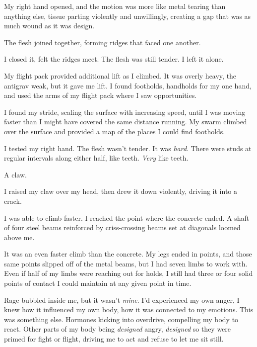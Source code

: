 My right hand opened, and the motion was more like metal tearing than anything else, tissue parting violently and unwillingly, creating a gap that was as much wound as it was design.



The flesh joined together, forming ridges that faced one another.



I closed it, felt the ridges meet.  The flesh was still tender.  I left it alone.



My flight pack provided additional lift as I climbed.  It was overly heavy, the antigrav weak, but it gave me lift.  I found footholds, handholds for my one hand, and used the arms of my flight pack where I saw opportunities.



I found my stride, scaling the surface with increasing speed, until I was moving faster than I might have covered the same distance running.  My swarm climbed over the surface and provided a map of the places I could find footholds.



I tested my right hand.  The flesh wasn't tender.  It was \emph{hard}.  There were studs at regular intervals along either half, like teeth.  \emph{Very} like teeth.



A claw.



I raised my claw over my head, then drew it down violently, driving it into a crack.



I was able to climb faster.  I reached the point where the concrete ended.  A shaft of four steel beams reinforced by criss-crossing beams set at diagonals loomed above me.



It was an even faster climb than the concrete.  My legs ended in points, and those same points slipped off of the metal beams, but I had seven limbs to work with.  Even if half of my limbs were reaching out for holds, I still had three or four solid points of contact I could maintain at any given point in time.



Rage bubbled inside me, but it wasn't \emph{mine}.  I'd experienced my own anger, I knew how it influenced my own body, how it was connected to my emotions.  This was something else.  Hormones kicking into overdrive, compelling my body to react.  Other parts of my body being \emph{designed} angry, \emph{designed }so they were primed for fight or flight, driving me to act and refuse to let me sit still.



